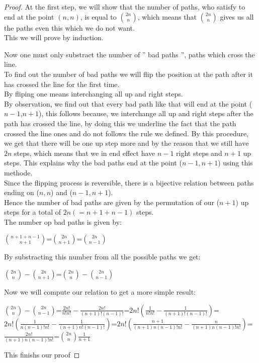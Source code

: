 \documentclass[a4paper,12pt,oneside]{article}
\begin{document}
\begin{proof}
At the first step, we will show that the number of paths, who satisfy to end at the point $(n,n)$, is equal to $\binom{2n}{n}$, which means that $\binom{2n}{n}$ gives us all the paths even this which we do not want.
\\
This we will prove by induction.

Now one must only substract the number of  '' bad paths '', paths which cross the line.
\\
To find out the number of bad paths we will flip the position at the path after it has crossed the line for the first time.
\\
By fliping one means interchanging all up and right steps.
\\

By observation, we find out that every bad path like that will end at the point ($n-1$,$n+1$), this follows because, we interchange all up and right steps after the path has crossed the line, by doing this we underline the fact that the path crossed the line ones and do not follows the rule we defined. By this procedure, we get that there will be one up step more and by the reason that we still have $2n$ steps, which means that we in end effect have $n-1$ right steps and $n+1$ up steps. This explains why the bad paths end at the point ($n-1,n+1$) using this methode.
\vspace{0,3cm}
\\Since the flipping process is reversible, there is a bijective relation between paths ending on ($n,n$) and ($n-1,n+1$).
\vspace{0,3cm}
\\Hence the number of bad paths are given by the permutation of our ($n+1$) up steps for a total of $2n(=n+1+n-1)$ steps.
\vspace{0,3cm}
\\The number op bad paths is given by:
\begin{center}
$\binom{n+1+n-1}{n+1}$=$\binom{2n}{n+1}$=$\binom{2n}{n-1}$
\end{center}
By substracting this number from all the possible paths we get:
\begin{center}
$\binom{2n}{n}-\binom{2n}{n+1}$=$\binom{2n}{n}-\binom{2n}{n-1}$ 
\end{center}
Now we will compute our relation to get a more simple result:
\begin{center}
$\binom{2n}{n}-\binom{2n}{n-1}$=$\frac{2n!}{n!n!}-\frac{2n!}{(n+1)!(n-1)!}$=$2n!(\frac{1}{n!n!}-\frac{1}{(n+1)!(n-1)!})$=$2n!(\frac{1}{n(n-1)!n!}-\frac{1}{(n+1)n!(n-1)!})$=$2n!(\frac{n+1}{(n+1)n(n-1)!n!}-\frac{n}{(n+1)n(n-1)!n!})$=$\frac{2n!}{(n+1)n(n-1)!n!}$=$\binom{2n}{n}\frac{1}{n+1}$
\end{center}
\vspace{0.2cm}
This finishs our proof
\end{proof}
\end{document}
